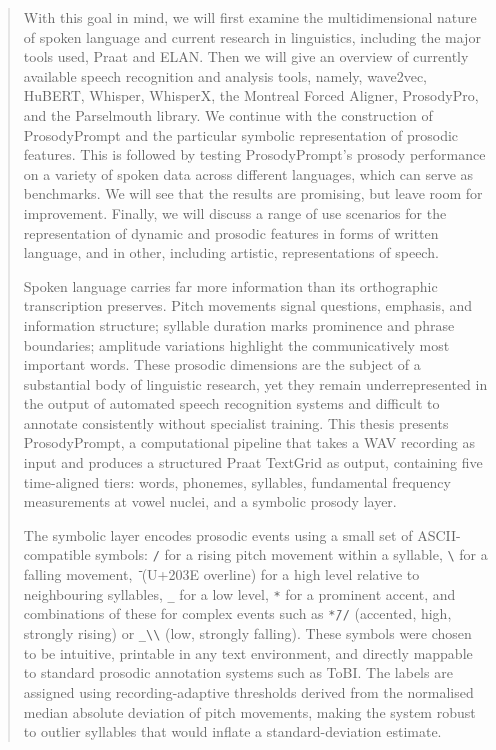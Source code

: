 \begin{abstract}
With this goal in mind, we will first examine the multidimensional nature of spoken language and current research in linguistics, including the major tools used, Praat and ELAN. Then we will give an overview of currently available speech recognition and analysis tools, namely, wave2vec, HuBERT, Whisper, WhisperX, the Montreal Forced Aligner, ProsodyPro, and the Parselmouth library. We continue with the construction of ProsodyPrompt and the particular symbolic representation of prosodic features. This is followed by testing ProsodyPrompt's prosody performance on a variety of spoken data across different languages, which can serve as benchmarks. We will see that the results are promising, but leave room for improvement. Finally, we will discuss a range of use scenarios for the representation of dynamic and prosodic features in forms of written language, and in other, including artistic, representations of speech.


Spoken language carries far more information than its orthographic transcription preserves. Pitch movements signal questions, emphasis, and information structure; syllable duration marks prominence and phrase boundaries; amplitude variations highlight the communicatively most important words. These prosodic dimensions are the subject of a substantial body of linguistic research, yet they remain underrepresented in the output of automated speech recognition systems and difficult to annotate consistently without specialist training. This thesis presents ProsodyPrompt, a computational pipeline that takes a WAV recording as input and produces a structured Praat TextGrid as output, containing five time-aligned tiers: words, phonemes, syllables, fundamental frequency measurements at vowel nuclei, and a symbolic prosody layer.

The symbolic layer encodes prosodic events using a small set of ASCII-compatible symbols: \texttt{/} for a rising pitch movement within a syllable, \texttt{\textbackslash} for a falling movement, \texttt{{\={}}} (U+203E overline) for a high level relative to neighbouring syllables, \texttt{\_} for a low level, \texttt{*} for a prominent accent, and combinations of these for complex events such as \texttt{*{\={}}//} (accented, high, strongly rising) or \texttt{\_\textbackslash\textbackslash} (low, strongly falling). These symbols were chosen to be intuitive, printable in any text environment, and directly mappable to standard prosodic annotation systems such as ToBI. The labels are assigned using recording-adaptive thresholds derived from the normalised median absolute deviation of pitch movements, making the system robust to outlier syllables that would inflate a standard-deviation estimate.


\end{abstract}

